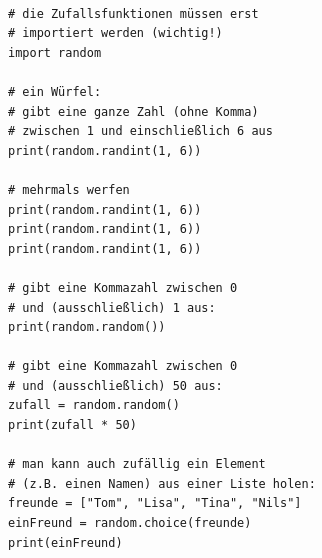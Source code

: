 	\paragraph*{}
	\begin{lstlisting}
# die Zufallsfunktionen müssen erst 
# importiert werden (wichtig!)
import random

# ein Würfel:
# gibt eine ganze Zahl (ohne Komma)
# zwischen 1 und einschließlich 6 aus
print(random.randint(1, 6))

# mehrmals werfen
print(random.randint(1, 6))
print(random.randint(1, 6))
print(random.randint(1, 6))

# gibt eine Kommazahl zwischen 0 
# und (ausschließlich) 1 aus:
print(random.random())

# gibt eine Kommazahl zwischen 0 
# und (ausschließlich) 50 aus:
zufall = random.random()
print(zufall * 50)

# man kann auch zufällig ein Element  
# (z.B. einen Namen) aus einer Liste holen:
freunde = ["Tom", "Lisa", "Tina", "Nils"]
einFreund = random.choice(freunde)
print(einFreund)
	\end{lstlisting}
